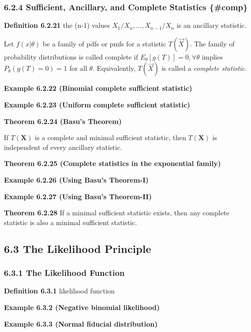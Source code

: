 \documentclass[10pt,twocolumn,portrait]{article}
\begin{document}
\hypertarget{Basu}{%
\subsubsection{6.2.4 Sufficient, Ancillary, and Complete Statistics
\{\#comp\}}\label{Basu}}

\textbf{Definition 6.2.21} the (n-1) values
\(X_1/X_n, . . . , X_{n-1}/X_n\) is an ancillary statistic.

Let \(f(x|\theta)\) be a family of pdfs or pmfs for a statistic
\(T(\vec X)\). The family of probability distributions is called
complete if \(E_\theta[g(T)]=0, \forall\theta\) implies
\(P_\theta(g(T)=0)=1\) for all \(\theta\). Equivalently, \(T(\vec X)\)
is called a \emph{complete statistic}.

\textbf{Example 6.2.22 (Binomial complete sufficient statistic)}

\textbf{Example 6.2.23 (Uniform complete sufficient statistic)}

\textbf{Theorem 6.2.24 (Basu's Theorem)}

If \(T(\mathbf{X})\) is a complete and minimal sufficient statistic,
then \(T(\mathbf{X})\) is independent of every ancillary statistic.

\textbf{Theorem 6.2.25 (Complete statistics in the exponential family)}

\textbf{Example 6.2.26 (Using Basu's Theorem-I)}

\textbf{Example 6.2.27 (Using Basu's Theorem-II)}

\textbf{Theorem 6.2.28} If a minimal sufficient statistic exists, then
any complete statistic is also a minimal sufficient statistic.

\hypertarget{the-likelihood-principle}{%
\subsection{6.3 The Likelihood
Principle}\label{the-likelihood-principle}}

\hypertarget{the-likelihood-function}{%
\subsubsection{6.3.1 The Likelihood
Function}\label{the-likelihood-function}}

\textbf{Definition 6.3.1} likelihood function

\textbf{Example 6.3.2 (Negative binomial likelihood)}

\textbf{Example 6.3.3 (Normal fiducial distribution)}
\end{document}
